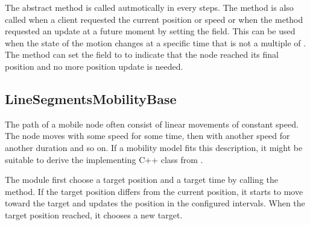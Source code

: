 The abstract  method is called autmotically in every
 steps. The method is also called when a client
requested the current position or speed or when the  method
requested an update at a future moment by setting the 
field. This can be used when the state of the motion changes at a
specific time that is not a multiple of .
The method can set the  field to  to
indicate that the node reached its final position and no more position
update is needed.


\subsection{LineSegmentsMobilityBase}

The path of a mobile node often consist of linear movements of constant
speed. The node moves with some speed for some time, then with another
speed for another duration and so on. If a mobility model fits this
description, it might be suitable to derive the implementing C++ class
from .

The module first choose a target position and a target time by calling
the  method. If the target position differs
from the current position, it starts to move toward the target and
updates the position in the configured  intervals.
When the target position reached, it chooses a new target.



\fi




